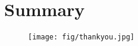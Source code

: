 \section*{Summary}
\begin{frame}{}
  \begin{figure}[htp]
    \begin{center}
      \texttt{[image: fig/thankyou.jpg]}
    \end{center}
  \end{figure}
\end{frame}
